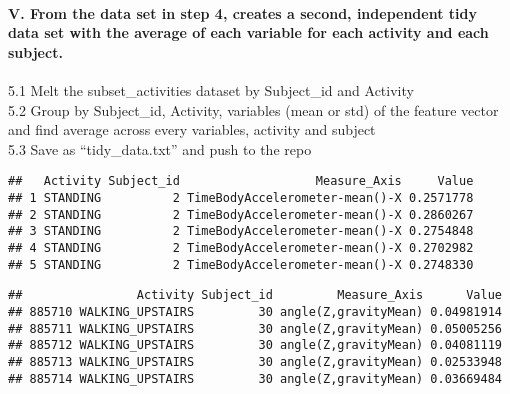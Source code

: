 \documentclass[
]{article}
\begin{document}
\hypertarget{v.-from-the-data-set-in-step-4-creates-a-second-independent-tidy-data-set-with-the-average-of-each-variable-for-each-activity-and-each-subject.}{%
\paragraph{V. From the data set in step 4, creates a second, independent
tidy data set with the average of each variable for each activity and
each
subject.}\label{v.-from-the-data-set-in-step-4-creates-a-second-independent-tidy-data-set-with-the-average-of-each-variable-for-each-activity-and-each-subject.}}

5.1 Melt the subset\_activities dataset by Subject\_id and Activity\\
5.2 Group by Subject\_id, Activity, variables (mean or std) of the
feature vector and find average across every variables, activity and
subject\\
5.3 Save as ``tidy\_data.txt'' and push to the repo

\begin{verbatim}
##   Activity Subject_id                   Measure_Axis     Value
## 1 STANDING          2 TimeBodyAccelerometer-mean()-X 0.2571778
## 2 STANDING          2 TimeBodyAccelerometer-mean()-X 0.2860267
## 3 STANDING          2 TimeBodyAccelerometer-mean()-X 0.2754848
## 4 STANDING          2 TimeBodyAccelerometer-mean()-X 0.2702982
## 5 STANDING          2 TimeBodyAccelerometer-mean()-X 0.2748330
\end{verbatim}

\begin{verbatim}
##                Activity Subject_id         Measure_Axis      Value
## 885710 WALKING_UPSTAIRS         30 angle(Z,gravityMean) 0.04981914
## 885711 WALKING_UPSTAIRS         30 angle(Z,gravityMean) 0.05005256
## 885712 WALKING_UPSTAIRS         30 angle(Z,gravityMean) 0.04081119
## 885713 WALKING_UPSTAIRS         30 angle(Z,gravityMean) 0.02533948
## 885714 WALKING_UPSTAIRS         30 angle(Z,gravityMean) 0.03669484
\end{verbatim}
\end{document}
